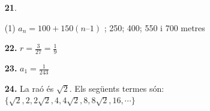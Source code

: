 \documentclass[a4paper, pdf, twoside]{book}
\begin{document}
\begin{multicols}{2}
\begin{enumerate}

 \item[\fontfamily{phv}\selectfont\color{blue}\textbf{21}. ] 
 \begin{tasks}[column-sep=1em, item-indent=1.3333em](1)
	 \task $a_n =100 + 150 (n – 1)$
	 ; 250; 400; 550 i 700 metres
\end{tasks}
\vspace{0.25cm}
\item[\fontfamily{phv}\selectfont\color{blue}\textbf{22. }] 
$r=\frac {3}{27}=\frac {1}{9}$
\vspace{0.25cm}
\item[\fontfamily{phv}\selectfont\color{blue}\textbf{23. }] 
$a_1=\frac {1}{243}$
\vspace{0.25cm}
\item[\fontfamily{phv}\selectfont\color{blue}\textbf{24. }] 
La raó és $\sqrt {2}$. Els següents termes són: $\{\sqrt {2},2,2\sqrt {2},4,4\sqrt {2},8,8\sqrt {2},16,{\cdots }\}$ 
 \end{enumerate}
\vspace{0.3cm}



\end{multicols}
\end{document}
